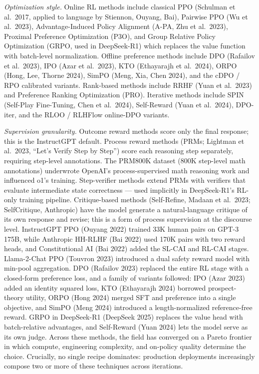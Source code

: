 \emph{Optimization style.} Online RL methods include classical PPO (Schulman et al.~2017, applied to language by Stiennon, Ouyang, Bai), Pairwise PPO (Wu et al.~2023), Advantage-Induced Policy Alignment (A-PA, Zhu et al.~2023), Proximal Preference Optimization (P3O), and Group Relative Policy Optimization (GRPO, used in DeepSeek-R1) which replaces the value function with batch-level normalization. Offline preference methods include DPO (Rafailov et al.~2023), IPO (Azar et al.~2023), KTO (Ethayarajh et al.~2024), ORPO (Hong, Lee, Thorne 2024), SimPO (Meng, Xia, Chen 2024), and the cDPO / RPO calibrated variants. Rank-based methods include RRHF (Yuan et al.~2023) and Preference Ranking Optimization (PRO). Iterative methods include SPIN (Self-Play Fine-Tuning, Chen et al.~2024), Self-Reward (Yuan et al.~2024), DPO-iter, and the RLOO / RLHFlow online-DPO variants.

\emph{Supervision granularity.} Outcome reward methods score only the final response; this is the InstructGPT default. Process reward methods (PRMs; Lightman et al.~2023, ``Let's Verify Step by Step'') score each reasoning step separately, requiring step-level annotations. The PRM800K dataset (800K step-level math annotations) underwrote OpenAI's process-supervised math reasoning work and influenced o1's training. Step-verifier methods extend PRMs with verifiers that evaluate intermediate state correctness --- used implicitly in DeepSeek-R1's RL-only training pipeline. Critique-based methods (Self-Refine, Madaan et al.~2023; SelfCritique, Anthropic) have the model generate a natural-language critique of its own response and revise; this is a form of process supervision at the discourse level. InstructGPT PPO (Ouyang 2022) trained 33K human pairs on GPT-3 175B, while Anthropic HH-RLHF (Bai 2022) used 170K pairs with two reward heads, and Constitutional AI (Bai 2022) added the SL-CAI and RL-CAI stages. Llama-2-Chat PPO (Touvron 2023) introduced a dual safety reward model with min-pool aggregation. DPO (Rafailov 2023) replaced the entire RL stage with a closed-form preference loss, and a family of variants followed: IPO (Azar 2023) added an identity squared loss, KTO (Ethayarajh 2024) borrowed prospect-theory utility, ORPO (Hong 2024) merged SFT and preference into a single objective, and SimPO (Meng 2024) introduced a length-normalized reference-free reward. GRPO in DeepSeek-R1 (DeepSeek 2025) replaces the value head with batch-relative advantages, and Self-Reward (Yuan 2024) lets the model serve as its own judge. Across these methods, the field has converged on a Pareto frontier in which compute, engineering complexity, and on-policy quality determine the choice. Crucially, no single recipe dominates: production deployments increasingly compose two or more of these techniques across iterations.

